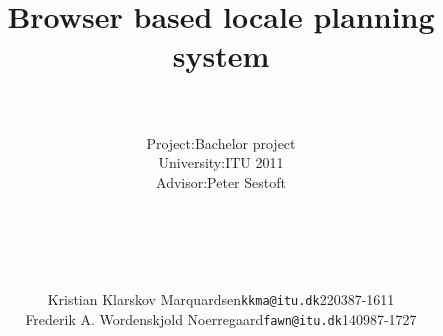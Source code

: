 \documentclass[12pt,a4paper]{report}
\begin{document}

\title{\Huge{\textsf{\textbf{Browser based locale planning system}}}}
\author{
		\hline \\
		\begin{tabular}{ l l }
		Project: & Bachelor project \\
		University: & ITU 2011 \\
		Advisor: & Peter Sestoft\\
		\end{tabular}\\
		\mbox{} \\
		\hline \\
		\mbox{}\\
		\begin{tabular} { l l l }
				Kristian Klarskov Marquardsen & \texttt{kkma@itu.dk} &220387-1611\\
				Frederik A. Wordenskjold Noerregaard & \texttt{fawn@itu.dk} & 140987-1727\\
		\end{tabular}\\
		\mbox{}}
\date{}
\maketitle

\tableofcontents

\appendix
\end{document}
